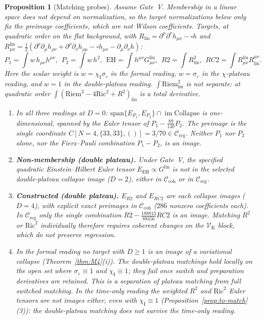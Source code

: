 \documentclass{article}
\newtheorem{proposition}{Proposition}
\theoremstyle{remark}
\newcommand{\sigeps}{\sigma_\varepsilon}
\newcommand{\chiI}{\chi_{\mathrm I}}
\newcommand{\Ccoh}{\mathcal C_{\mathrm{coh}}}
\newcommand{\Creg}{\mathcal C_{\mathrm{reg}}}
\newcommand{\Coll}{\mathrm{Collapse}}
\begin{document}
\begin{proposition}[Matching probes]
\label{prop:match}
Assume Gate~V.
Membership in a linear space does not depend on normalization, so the target normalizations below only fix the preimage coefficients, which are not Wilson coefficients.
Targets, at quadratic order on the flat background, with $R_{\mathrm{lin}}=\partial^\mu\partial^\nu h_{\mu\nu}-\square h$ and $R^{\mathrm{lin}}_{\mu\nu}=\tfrac12(\partial^\rho\partial_\mu h_{\rho\nu}+\partial^\rho\partial_\nu h_{\rho\mu}-\square h_{\mu\nu}-\partial_\mu\partial_\nu h)$:
\[
P_1=\int w\,h_{\mu\nu}h^{\mu\nu},\ \ P_2=\int w\,h^2,\ \ \mathrm{EH}=\int h^{\mu\nu}G^{\mathrm{lin}}_{\mu\nu},\ \ R2=\int R_{\mathrm{lin}}^2,\ \ RC2=\int R^{\mathrm{lin}}_{\mu\nu}R_{\mathrm{lin}}^{\mu\nu}.
\]
Here the scalar weight is
$w=\chiI\sigeps$ in the formal reading,
$w=\sigeps$ in the $\chi$-plateau reading, and
$w=1$ in the double-plateau reading.
$\int\mathrm{Riem}_{\mathrm{lin}}^2$ is not separate: at quadratic order $\int(\mathrm{Riem}^2-4\mathrm{Ric}^2+R^2)_{\mathrm{lin}}$ is a total derivative.
\begin{enumerate}
\item In all three readings at $D=0$: $\mathrm{span}\{E_{P_1},E_{P_2}\}\cap\operatorname{im}\Coll$ is one-dimensional, spanned by the Euler tensor of $P_1-\tfrac{89}{140}P_2$.
The preimage is the single coordinate $C[N=4,\{33,33\},()]=3/70\in\Creg$.
Neither $P_1$ nor $P_2$ alone, nor the Fierz--Pauli combination $P_1-P_2$, is an image.
\item \textbf{Non-membership (double plateau).} Under Gate~V, the specified quadratic Einstein--Hilbert Euler tensor $E_{\mathrm{EH}}\propto G^{\mathrm{lin}}$ is not in the selected double-plateau collapse image ($D=2$), either in $\Ccoh$ or in $\Creg$.
\item \textbf{Constructed (double plateau).} $E_{R2}$ and $E_{RC2}$ are each collapse images ($D=4$), with explicit exact preimages in $\Ccoh$ ($286$ nonzero coefficients each).
In $\Creg$ only the single combination $R2-\tfrac{188813}{88456}RC2$ is an image.
Matching $R^2$ or $\mathrm{Ric}^2$ individually therefore requires coherent changes on the $\mathcal V_{\mathrm K}$ block, which do not preserve regression.
\item In the formal reading no target with $D\ge1$ is an image of a variational collapse (Theorem~\ref{thm:M4}(i)).
The double-plateau matchings hold locally on the open set where $\sigeps\equiv1$ and $\chiI\equiv1$; they fail once switch and preparation derivatives are retained.
This is a separation of plateau matching from full switched matching.
In the time-only reading the weighted $R^2$ and $\mathrm{Ric}^2$ Euler tensors are not images either, even with $\chiI\equiv1$ (Proposition~\ref{prop:to-match}(3)): the double-plateau matching does not survive the time-only reading.
\end{enumerate}
\end{proposition}
\end{document}
